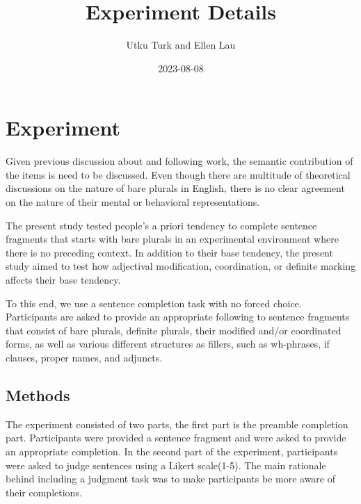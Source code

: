 \documentclass[
  10pt,
  letterpaper,
  DIV=11,
  numbers=noendperiod]{scrartcl}
\title{Experiment Details}
\author{Utku Turk and Ellen Lau}
\date{2023-08-08}
\renewcommand\maketitle{
  \fancyhead[C]{
    \mythetitle
    \ifx \theauthor\empty  \else \ – \theauthor \fi
    \ifx \thedate\empty  \else \ – \thedate \ \fi
    – Word Count: 1338
  }
}
\begin{document}
\maketitle
\ifdefined\Shaded\renewenvironment{Shaded}{\begin{tcolorbox}[enhanced, breakable, borderline west={3pt}{0pt}{shadecolor}, boxrule=0pt, frame hidden, interior hidden, sharp corners]}{\end{tcolorbox}}\fi

\hypertarget{experiment}{%
\section{Experiment}\label{experiment}}

Given previous discussion about \textcite{LauLiao2018} and following
work, the semantic contribution of the items is need to be discussed.
Even though there are multitude of theoretical discussions on the nature
of bare plurals in English, there is no clear agreement on the nature of
their mental or behavioral representations.

The present study tested people's a priori tendency to complete sentence
fragments that starts with bare plurals in an experimental environment
where there is no preceding context. In addition to their base tendency,
the present study aimed to test how adjectival modification,
coordination, or definite marking affects their base tendency.

To this end, we use a sentence completion task with no forced choice.
Participants are asked to provide an appropriate following to sentence
fragments that consist of bare plurals, definite plurals, their modified
and/or coordinated forms, as well as various different structures as
fillers, such as wh-phrases, if clauses, proper names, and adjuncts.

\hypertarget{methods}{%
\subsection{Methods}\label{methods}}

The experiment consisted of two parts, the first part is the preamble
completion part. Participants were provided a sentence fragment and were
asked to provide an appropriate completion. In the second part of the
experiment, participants were asked to judge sentences using a Likert
scale(1-5). The main rationale behind including a judgment task was to
make participants be more aware of their completions.
\end{document}
